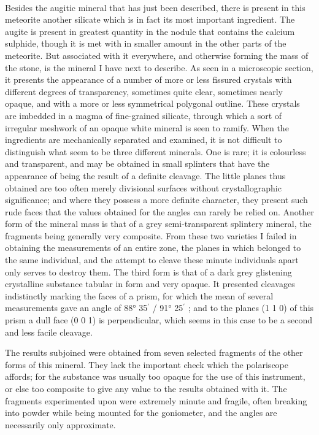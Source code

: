 \documentclass[a4paper, 12pt, oneside]{article}
\begin{document}
\paragraph{}
Besides the augitic mineral that has just been described, there is present in this meteorite another silicate which is in fact its most important ingredient. The augite is present in greatest quantity in the nodule that contains the calcium sulphide, though it is met with in smaller amount in the other parts of the meteorite. But associated with it everywhere, and otherwise forming the mass of the stone, is the mineral I have next to describe. As seen in a microscopic section, it presents the appearance of a number of more or less fissured crystals with different degrees of transparency, sometimes quite clear, sometimes nearly opaque, and with a more or less symmetrical polygonal outline. These crystals are imbedded in a magma of fine-grained silicate, through which a sort of irregular meshwork of an opaque white mineral is seen to ramify. When the ingredients are mechanically separated and examined, it is not difficult to distinguish what seem to be three different minerals. One is rare; it is colourless and transparent, and may be obtained in small splinters that have the appearance of being the result of a definite cleavage. The little planes thus obtained are too often merely divisional surfaces without crystallographic significance; and where they possess a more definite character, they present such rude faces that the values obtained for the angles can rarely be relied on. Another form of the mineral mass is that of a grey semi-transparent splintery mineral, the fragments being generally very composite. From these two varieties I failed in obtaining the measurements of an entire zone, the planes in which belonged to the same individual, and the attempt to cleave these minute individuals apart only serves to destroy them. The third form is that of a dark grey glistening crystalline substance tabular in form and very opaque. It presented cleavages indistinctly marking the faces of a prism, for which the mean of several measurements gave an angle of { 88° 35$^{\prime}$ / 91° 25$^{\prime}$ }; and to the planes (1 1 0) of this prism a dull face (0 0 1) is perpendicular, which seems in this case to be a second and less facile cleavage.

The results subjoined were obtained from seven selected fragments of the other forms of this mineral. They lack the important check which the polariscope affords; for the substance was usually too opaque for the use of this instrument, or else too composite to give any value to the results obtained with it. The fragments experimented upon were extremely minute and fragile, often breaking into powder while being mounted for the goniometer, and the angles are necessarily only approximate.
\end{document}
